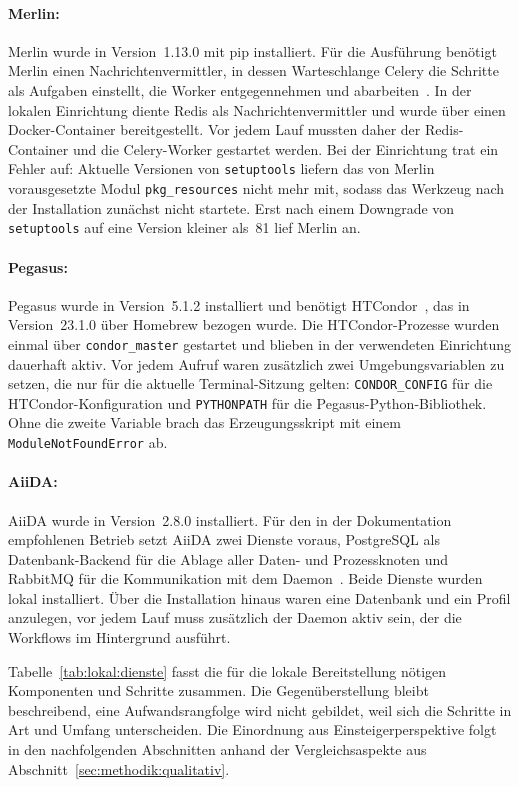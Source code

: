 \paragraph{Merlin:} Merlin wurde in Version~1.13.0 mit pip
installiert. Für die Ausführung benötigt Merlin einen
Nachrichtenvermittler, in dessen Warteschlange Celery die Schritte
als Aufgaben einstellt, die Worker entgegennehmen und
abarbeiten~\cite{merlindocs-celery}. In der lokalen Einrichtung diente Redis
als Nachrichtenvermittler und wurde über einen Docker-Container
bereitgestellt. Vor jedem Lauf mussten daher der Redis-Container und
die Celery-Worker gestartet werden. Bei der Einrichtung trat ein
Fehler auf: Aktuelle Versionen von \texttt{setuptools} liefern das
von Merlin vorausgesetzte Modul \texttt{pkg\_resources} nicht mehr
mit, sodass das Werkzeug nach der Installation zunächst nicht
startete. Erst nach einem Downgrade von \texttt{setuptools} auf eine
Version kleiner als~81 lief Merlin an.

\paragraph{Pegasus:} Pegasus wurde in Version~5.1.2 installiert und
benötigt HTCondor~\cite{pegasusdocs-install}, das in Version~23.1.0 über
Homebrew bezogen wurde. Die HTCondor-Prozesse wurden einmal über
\texttt{condor\_master} gestartet und blieben in der verwendeten
Einrichtung dauerhaft aktiv. Vor jedem Aufruf waren zusätzlich zwei
Umgebungsvariablen zu setzen, die nur für die aktuelle
Terminal-Sitzung gelten: \texttt{CONDOR\_CONFIG} für die
HTCondor-Konfiguration und \texttt{PYTHONPATH} für die
Pegasus-Python-Bibliothek. Ohne die zweite Variable brach das
Erzeugungsskript mit einem \texttt{ModuleNotFoundError} ab.

\paragraph{AiiDA:} AiiDA wurde in Version~2.8.0 installiert. Für den in der Dokumentation empfohlenen Betrieb setzt AiiDA zwei Dienste voraus, PostgreSQL als Datenbank-Backend für die Ablage aller Daten- und Prozessknoten und RabbitMQ für die Kommunikation mit dem Daemon~\cite{aiidadocs-install}. Beide Dienste wurden lokal installiert. Über die Installation hinaus waren eine Datenbank und ein Profil anzulegen, vor jedem Lauf muss zusätzlich der Daemon aktiv sein, der die Workflows im Hintergrund ausführt.

Tabelle~\ref{tab:lokal:dienste} fasst die für die lokale
Bereitstellung nötigen Komponenten und Schritte zusammen. Die
Gegenüberstellung bleibt beschreibend, eine Aufwandsrangfolge wird
nicht gebildet, weil sich die Schritte in Art und Umfang
unterscheiden. Die Einordnung aus Einsteigerperspektive folgt in den
nachfolgenden Abschnitten anhand der Vergleichsaspekte aus
Abschnitt~\ref{sec:methodik:qualitativ}.

